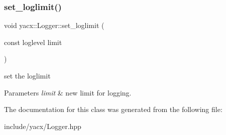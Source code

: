 \subsubsection{\texorpdfstring{set\+\_\+loglimit()}{set\_loglimit()}}
{\footnotesize\ttfamily void yacx\+::\+Logger\+::set\+\_\+loglimit (\begin{DoxyParamCaption}\item[{const loglevel}]{limit }\end{DoxyParamCaption})\hspace{0.3cm}{\ttfamily [inline]}}

set the loglimit 
\begin{DoxyParams}{Parameters}
{\em limit} & new limit for logging. \\
\hline
\end{DoxyParams}


The documentation for this class was generated from the following file\+:\begin{DoxyCompactItemize}
\item 
include/yacx/Logger.\+hpp\end{DoxyCompactItemize}
